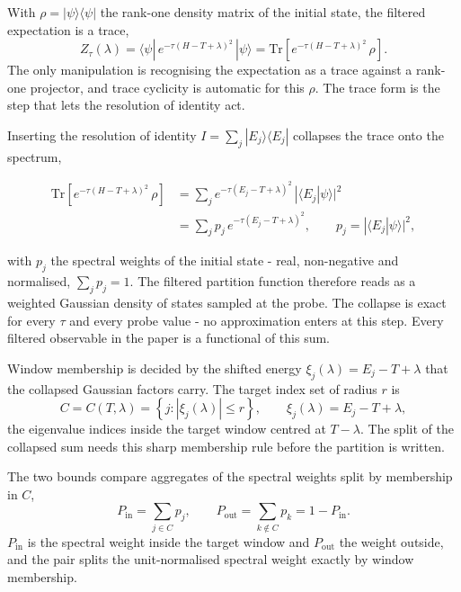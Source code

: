 With $\rho = |\psi\rangle\langle\psi|$ the rank-one density matrix of the initial state, the filtered expectation is a trace,
\begin{equation*}
Z_\tau(\lambda) = \langle \psi | \, e^{-\tau (H - T + \lambda)^2} \, | \psi \rangle
= \mathrm{Tr}\!\left[ e^{-\tau (H - T + \lambda)^2} \, \rho \right] .
\end{equation*}
The only manipulation is recognising the expectation as a trace against a rank-one projector, and trace cyclicity is automatic for this $\rho$. The trace form is the step that lets the resolution of identity act.

Inserting the resolution of identity $I = \sum_j |E_j\rangle\langle E_j|$ collapses the trace onto the spectrum,
\begin{widetext}
\begin{align*}
\mathrm{Tr}\!\left[ e^{-\tau (H - T + \lambda)^2} \, \rho \right]
&= \sum_j e^{-\tau (E_j - T + \lambda)^2} \, |\langle E_j | \psi \rangle|^2 \\
&= \sum_j p_j \, e^{-\tau (E_j - T + \lambda)^2} , \qquad p_j = |\langle E_j | \psi \rangle|^2 ,
\end{align*}
\end{widetext}
with $p_j$ the spectral weights of the initial state - real, non-negative and normalised, $\sum_j p_j = 1$. The filtered partition function therefore reads as a weighted Gaussian density of states sampled at the probe. The collapse is exact for every $\tau$ and every probe value - no approximation enters at this step. Every filtered observable in the paper is a functional of this sum.

Window membership is decided by the shifted energy $\xi_j(\lambda) = E_j - T + \lambda$ that the collapsed Gaussian factors carry. The target index set of radius $r$ is
\begin{equation*}
C = C(T, \lambda) = \left\{ j : |\xi_j(\lambda)| \le r \right\} , \qquad \xi_j(\lambda) = E_j - T + \lambda ,
\end{equation*}
the eigenvalue indices inside the target window centred at $T - \lambda$. The split of the collapsed sum needs this sharp membership rule before the partition is written.

The two bounds compare aggregates of the spectral weights split by membership in $C$,
\begin{equation*}
P_{\mathrm{in}} = \sum_{j \in C} p_j , \qquad
P_{\mathrm{out}} = \sum_{k \notin C} p_k = 1 - P_{\mathrm{in}} .
\end{equation*}
$P_{\mathrm{in}}$ is the spectral weight inside the target window and $P_{\mathrm{out}}$ the weight outside, and the pair splits the unit-normalised spectral weight exactly by window membership.

